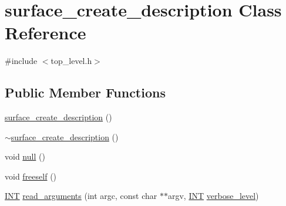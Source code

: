 \hypertarget{classsurface__create__description}{}\section{surface\+\_\+create\+\_\+description Class Reference}
\label{classsurface__create__description}


{\ttfamily \#include $<$top\+\_\+level.\+h$>$}

\subsection*{Public Member Functions}
\begin{DoxyCompactItemize}
\item 
\mbox{\hyperlink{classsurface__create__description_af1e23dea6456bec3bc94bf4f08261f87}{surface\+\_\+create\+\_\+description}} ()
\item 
\mbox{\hyperlink{classsurface__create__description_a7377865a78fd0a9afb3cc4bf1d912107}{$\sim$surface\+\_\+create\+\_\+description}} ()
\item 
void \mbox{\hyperlink{classsurface__create__description_a6733f00bd7a23ce919e848a0e6ebd062}{null}} ()
\item 
void \mbox{\hyperlink{classsurface__create__description_a0cc5e398865d8dd0b91d7decd0be0f07}{freeself}} ()
\item 
\mbox{\hyperlink{galois_8h_a09fddde158a3a20bd2dcadb609de11dc}{I\+NT}} \mbox{\hyperlink{classsurface__create__description_a1a70cb7ee8b7a05172c13eb40b167728}{read\+\_\+arguments}} (int argc, const char $\ast$$\ast$argv, \mbox{\hyperlink{galois_8h_a09fddde158a3a20bd2dcadb609de11dc}{I\+NT}} \mbox{\hyperlink{simeon_8_c_a818073fbcc2f439e7c56952f67386122}{verbose\+\_\+level}})
\end{DoxyCompactItemize}
